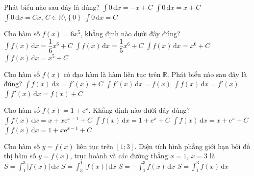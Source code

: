 \begin{ex}%
	Phát biểu nào sau  đây là đúng?
	\choice 
		{$\displaystyle\int 0 \mathrm{\,d}x =  -x+C$}
		{$\displaystyle\int 0 \mathrm{\,d}x  =x+ C$}
		 {$\displaystyle\int 0 \mathrm{\,d}x = Cx,\, C\in \mathbb{R}\setminus \left\lbrace 0\right\rbrace $}
		 {\True $\displaystyle\int 0 \mathrm{\,d}x = C$}
\end{ex}

\begin{ex}%
	Cho hàm số $f(x)=6 x^{5}$,  khẳng định nào dưới đây đúng?
	\choice 
		{$\displaystyle\int  f(x) \mathrm{\,d} x=\dfrac{1}{6} x^{6}+C$}
		 {$\displaystyle\int f(x) \mathrm{\,d} x=\dfrac{1}{5} x^{6}+C$}
		{\True $\displaystyle\int f(x) \mathrm{\,d}  x=x^{6}+C$}
		{$\displaystyle\int f(x) \mathrm{\,d} x=x^{5}+C$} 
\end{ex}

\begin{ex}%
	Cho hàm số $f(x)$ có đạo hàm là hàm liên tục trên $\mathbb{R}$. Phát biểu  nào sau đây là đúng?
	 \choice
		{$\displaystyle\int  f(x) \mathrm{\,d}x=f'(x)+C$}
		{$\displaystyle\int  f'(x) \mathrm{\,d}x=f(x)$}
		{$\displaystyle\int f(x)  \mathrm{\,d}x=f'(x)$}
		{\True $\displaystyle\int f'(x) \mathrm{\,d}x=f(x)+C$} 
\end{ex}

\begin{ex}%
	Cho  hàm số $f(x)=1+\mathrm{e}^x$. Khẳng định nào dưới đây đúng?
	 \choice
		 {$\displaystyle\int f(x)\mathrm{\,d}x=x+x \mathrm{e}^{x-1}+C$}
		{$\displaystyle\int f(x)\mathrm{\,d}x=1+\mathrm{e}^x+C$} 
		{\True $\displaystyle\int f(x)\mathrm{\,d}x=x+\mathrm{e}^x+C$} 
		{$\displaystyle\int  f(x)\mathrm{\,d}x=1+x \mathrm{e}^{x-1}+C$}
\end{ex}

\begin{ex}%
	Cho hàm số $y=f(x)$ liên tục trên $[1; 3]$. Diện  tích hình phẳng giới hạn bởi đồ thị hàm số $y=f(x)$, trục hoành và các đường thẳng $x=1$, $x=3$ là
	\choice 
		{\True  $S=\displaystyle\int_1^3|f(x)|\mathrm{\,d}x$}
		{$S=\displaystyle\int_3^1|f(x)|\mathrm{\,d}x$} 
		 {$S=-\displaystyle\int_1^3f(x)\mathrm{\,d}x$}
		{$S=\displaystyle\int_1^3f(x)\mathrm{\,d}x$} 
\end{ex}

